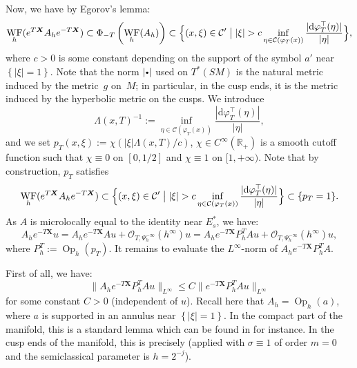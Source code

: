 \documentclass[10pt]{amsart}
\newcommand{\sbullet}{{\scriptscriptstyle\bullet}}
\newcommand{\csbullet}{{\raisebox{1pt}{$\sbullet$}}}
\newcommand{\R}{\mathbb{R}}
\newcommand{\mc}{\mathcal}
\newcommand{\dd}{\mathrm{d}}
\newcommand{\X}{\boldsymbol{X}}
\DeclareMathOperator{\Op}{Op}
\DeclareMathOperator{\WF}{WF}
\theoremstyle{plain}
\theoremstyle{definition}
\begin{document}
Now, we have by Egorov's lemma:
\[
\WF_h(e^{T \X} A_h e^{-T\X}) \subset \Phi_{-T}\left(\WF_h(A_h)\right) \subset \Bigl\{ (x,\xi) \in \mc{C}' \bigm| |\xi| > c \inf_{\eta \in \mc{C}(\varphi_T(x))} \dfrac{|\dd \varphi_T^{\top}(\eta)|}{|\eta|} \Bigr\},
\]
where $c>0$ is some constant depending on the support of the symbol $a'$ near $\left\{|\xi|=1\right\}$. Note that the norm $|\csbullet|$ used on $T^*(SM)$ is the natural metric induced by the metric~$g$ on~$M$; in particular, in the cusp ends, it is the metric induced by the hyperbolic metric on the cusps. We introduce
\[
\Lambda(x,T)^{-1} := \inf_{\eta \in \mc{C}(\varphi_T(x))} \dfrac{|\dd \varphi_T^{\top}(\eta)|}{|\eta|},
\]
and we set $p_T(x,\xi) := \chi(|\xi| \Lambda(x,T)/c)$,
$\chi \in C^\infty(\R_+)$ is a smooth cutoff function such that $\chi \equiv 0$ on $[0,1/2]$ and $\chi \equiv 1$ on $[1,+\infty)$. Note that by construction, $p_T$ satisfies
\[
\WF_h(e^{T \X} A_h e^{-T\X}) \subset \Bigl\{ (x,\xi) \in \mc{C}' \bigm| |\xi| > c \inf_{\eta \in \mc{C}(\varphi_T(x))} \dfrac{|\dd \varphi_T^{\top}(\eta)|}{|\eta|} \Bigr\} \subset\{p_T =1\}.
\]
As $A$ is microlocally equal to the identity near $E_s^*$, we have:
\[
A_h e^{-T\X}u = A_h e^{-T\X} Au + \mc{O}_{T, \Psi_h^{-\infty}}(h^\infty)u= A_h e^{-T\X} P_h^T Au + \mc{O}_{T, \Psi_h^{-\infty}}(h^\infty)u,
\]
where $P_h^T := \Op_h(p_T)$. It remains to evaluate the $L^\infty$-norm of $A_h e^{-T\X} P_h^T A$.

First of all, we have:
\[
\|A_h e^{-T\X} P_h^T A u\|_{L^\infty} \leq C \|e^{-T \X} P_h^T Au\|_{L^\infty}
\]
for some constant $C > 0$ (independent of $u$). Recall here that $A_h = \Op_h(a)$, where $a$ is supported in an annulus near $\left\{|\xi|=1\right\}$. In the compact part of the manifold, this is a standard lemma which can be found in \cite[Lem.\,2.4]{Bonthonneau-Lefeuvre-21} for instance. In the cusp ends of the manifold, this is precisely \cite[Lem.\,3.2]{Bonthonneau-Lefeuvre-19-1} (applied with $\sigma \equiv 1$ of order $m=0$ and the semiclassical parameter is $h = 2^{-j}$).
\end{document}
